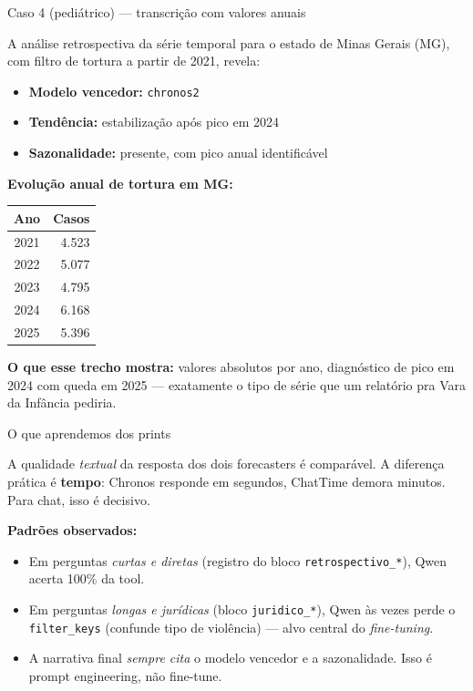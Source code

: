 \documentclass[10pt,aspectratio=169]{beamer}
\newcommand{\code}[1]{\texttt{\small #1}}
\begin{document}
\begin{frame}{Caso 4 (pediátrico) --- transcrição com valores anuais}
\footnotesize
\begin{resposta}
A análise retrospectiva da série temporal para o estado de Minas
Gerais (MG), com filtro de tortura a partir de 2021, revela:
\begin{itemize}\setlength\itemsep{0pt}
\item \textbf{Modelo vencedor:} \code{chronos2}
\item \textbf{Tendência:} estabilização após pico em 2024
\item \textbf{Sazonalidade:} presente, com pico anual identificável
\end{itemize}

\textbf{Evolução anual de tortura em MG:}
\begin{center}
\begin{tabular}{cr}
\toprule
\textbf{Ano} & \textbf{Casos} \\
\midrule
2021 & 4.523 \\
2022 & 5.077 \\
2023 & 4.795 \\
2024 & 6.168 \\
2025 & 5.396 \\
\bottomrule
\end{tabular}
\end{center}
\end{resposta}

\vspace{0.3em}
\textbf{O que esse trecho mostra:} valores absolutos por ano,
diagnóstico de pico em 2024 com queda em 2025 --- exatamente o
tipo de série que um relatório pra Vara da Infância pediria.
\end{frame}

\begin{frame}{O que aprendemos dos prints}
\begin{destaque}
A qualidade \emph{textual} da resposta dos dois forecasters é
comparável. A diferença prática é \textbf{tempo}: Chronos responde
em segundos, ChatTime demora minutos. Para chat, isso é decisivo.
\end{destaque}

\vspace{0.5em}
\textbf{Padrões observados:}
\begin{itemize}\small
\item Em perguntas \emph{curtas e diretas} (registro do bloco
\code{retrospectivo\_*}), Qwen acerta 100\% da tool.
\item Em perguntas \emph{longas e jurídicas} (bloco
\code{juridico\_*}), Qwen às vezes perde o \code{filter\_keys}
(confunde tipo de violência) --- alvo central do \emph{fine-tuning}.
\item A narrativa final \emph{sempre cita} o modelo vencedor e a
sazonalidade. Isso é prompt engineering, não fine-tune.
\end{itemize}
\end{frame}
\end{document}
